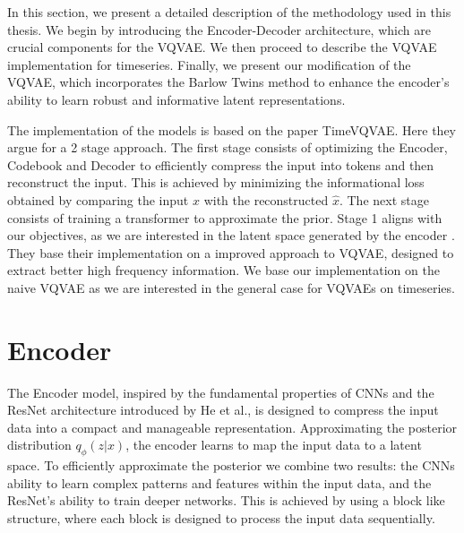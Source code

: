 
In this section, we present a detailed description of the methodology used in this thesis. We begin by introducing the Encoder-Decoder architecture, which are crucial components for the VQVAE. We then proceed to describe the VQVAE implementation for timeseries. Finally, we present our modification of the VQVAE, which incorporates the Barlow Twins method to enhance the encoder's ability to learn robust and informative latent representations.

The implementation of the models is based on the paper TimeVQVAE\cite{lee2023masked}. Here they argue for a 2 stage approach. The first stage consists of optimizing the Encoder, Codebook and Decoder to efficiently compress the input into tokens and then reconstruct the input.
This is achieved by minimizing the informational loss obtained by comparing the input $x$ with the reconstructed $\hat{x}$. The next stage consists of training a transformer to approximate the prior.
Stage 1 aligns with our objectives, as we are interested in the latent space generated by the encoder . They base their implementation on a improved approach to VQVAE, designed to extract better high frequency information. We base our implementation on the naive VQVAE as we are interested in the general case for VQVAEs on timeseries.


\section{Encoder}

The Encoder model, inspired by the fundamental properties of CNNs and the ResNet architecture introduced by He et al.\cite{ResLearn}, is designed to compress the input data into a compact and manageable representation.
Approximating the posterior distribution $q_\phi(z|x)$, the encoder learns to map the input data to a latent space. 
To efficiently approximate the posterior we combine two results: the CNNs ability to learn complex patterns and features within the input data, and the ResNet's ability to train deeper networks. This is achieved by using a block like structure, where each block is designed to process the input data sequentially.

